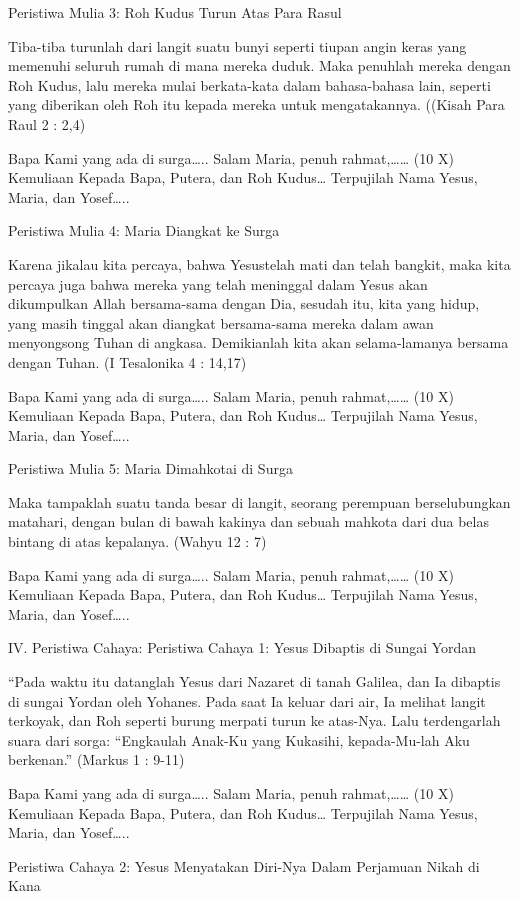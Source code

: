 \documentclass[a5paper,headsepline,titlepage,11pt,nnormalheadings,DIVcalc]{scrbook}
\begin{document}
	Peristiwa Mulia 3: Roh Kudus Turun Atas Para Rasul

Tiba-tiba turunlah dari langit suatu bunyi seperti tiupan angin keras yang memenuhi seluruh rumah di mana mereka duduk. Maka penuhlah mereka dengan Roh Kudus, lalu mereka mulai berkata-kata dalam bahasa-bahasa lain, seperti yang diberikan oleh Roh itu kepada mereka untuk mengatakannya.
((Kisah Para Raul 2 : 2,4)

Bapa Kami yang ada di surga…..
Salam Maria, penuh rahmat,…… (10 X)
Kemuliaan Kepada Bapa, Putera, dan Roh Kudus…
Terpujilah Nama Yesus, Maria, dan Yosef…..

	Peristiwa Mulia 4: Maria Diangkat ke Surga

Karena jikalau kita percaya, bahwa Yesustelah mati dan telah bangkit, maka kita percaya juga bahwa mereka yang telah meninggal dalam Yesus akan dikumpulkan Allah bersama-sama dengan Dia, sesudah itu, kita yang hidup, yang masih tinggal akan diangkat bersama-sama mereka dalam awan menyongsong Tuhan di angkasa. Demikianlah kita akan selama-lamanya bersama dengan Tuhan.
(I Tesalonika 4 : 14,17)

Bapa Kami yang ada di surga…..
Salam Maria, penuh rahmat,…… (10 X)
Kemuliaan Kepada Bapa, Putera, dan Roh Kudus…
Terpujilah Nama Yesus, Maria, dan Yosef…..

	Peristiwa Mulia 5: Maria Dimahkotai di Surga

Maka tampaklah suatu tanda besar di langit, seorang perempuan berselubungkan matahari, dengan bulan di bawah kakinya dan sebuah mahkota dari dua belas bintang di atas kepalanya.
(Wahyu 12 : 7)

Bapa Kami yang ada di surga…..
Salam Maria, penuh rahmat,…… (10 X)
Kemuliaan Kepada Bapa, Putera, dan Roh Kudus…
Terpujilah Nama Yesus, Maria, dan Yosef…..

IV. Peristiwa Cahaya:
	Peristiwa Cahaya 1: Yesus Dibaptis di Sungai Yordan

“Pada waktu itu datanglah Yesus dari Nazaret di tanah Galilea, dan Ia dibaptis di sungai Yordan oleh Yohanes. Pada saat Ia keluar dari air, Ia melihat langit terkoyak, dan Roh seperti burung merpati turun ke atas-Nya. Lalu terdengarlah suara dari sorga: “Engkaulah Anak-Ku yang Kukasihi, kepada-Mu-lah Aku berkenan.” (Markus 1 : 9-11)

Bapa Kami yang ada di surga…..
Salam Maria, penuh rahmat,…… (10 X)
Kemuliaan Kepada Bapa, Putera, dan Roh Kudus…
Terpujilah Nama Yesus, Maria, dan Yosef…..

	Peristiwa Cahaya 2: Yesus Menyatakan Diri-Nya Dalam Perjamuan Nikah di Kana
\end{document}
